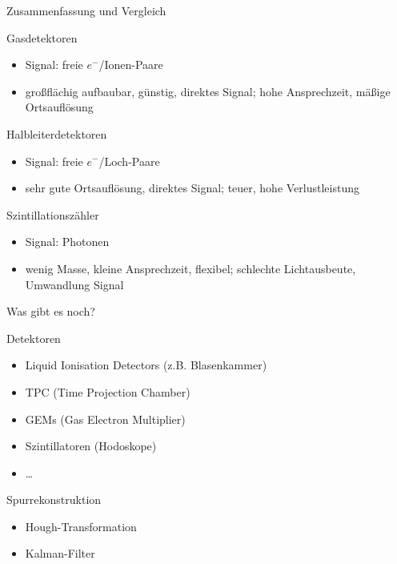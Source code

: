 

\begin{frame}{Zusammenfassung und Vergleich}
	
	\begin{block}{Gasdetektoren}
			\begin{itemize}
		  \item Signal: freie $e^-$/Ionen-Paare
		  \item großflächig aufbaubar, günstig, direktes Signal; hohe Ansprechzeit, mäßige Ortsauflösung
		\end{itemize}
	\end{block}
	\begin{block}{Halbleiterdetektoren}
			\begin{itemize}
		  \item Signal: freie $e^-$/Loch-Paare
		  \item sehr gute Ortsauflösung, direktes Signal; teuer, hohe Verlustleistung
		\end{itemize}
	\end{block}
	\begin{block}{Szintillationszähler}
			\begin{itemize}
		  \item Signal: Photonen
		  \item wenig Masse, kleine Ansprechzeit, flexibel; schlechte Lichtausbeute, Umwandlung Signal
		\end{itemize}
	\end{block}

\end{frame}


\begin{frame}{Was gibt es noch?}
	
	\begin{block}{Detektoren}
		\begin{itemize}
		  \item Liquid Ionisation Detectors (z.B. Blasenkammer)
		  \item TPC (Time Projection Chamber)
		  \item GEMs (Gas Electron Multiplier)
		  \item Szintillatoren (Hodoskope)
		  \item \ldots
		\end{itemize}
	\end{block}
	
		\begin{block}{Spurrekonstruktion}
		\begin{itemize}
		  \item Hough-Transformation
		  \item Kalman-Filter
		\end{itemize}
	\end{block}

\end{frame}